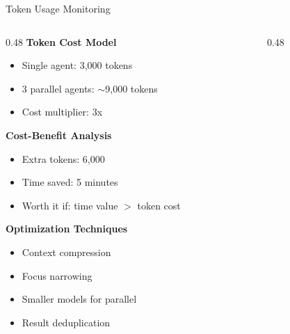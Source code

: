 \documentclass[aspectratio=169,11pt]{beamer}
\begin{document}
\begin{frame}{Token Usage Monitoring}
    \begin{columns}[T]
        \begin{column}{0.48\textwidth}
            \textbf{Token Cost Model}
            \begin{itemize}
                \item Single agent: 3,000 tokens
                \item 3 parallel agents: $\sim$9,000 tokens
                \item Cost multiplier: 3x
            \end{itemize}

            \vspace{0.2cm}
            \textbf{Cost-Benefit Analysis}
            \begin{itemize}
                \footnotesize
                \item Extra tokens: 6,000
                \item Time saved: 5 minutes
                \item Worth it if: time value $>$ token cost
            \end{itemize}

            \vspace{0.2cm}
            \textbf{Optimization Techniques}
            \begin{itemize}
                \footnotesize
                \item Context compression
                \item Focus narrowing
                \item Smaller models for parallel
                \item Result deduplication
            \end{itemize}
        \end{column}
        \begin{column}{0.48\textwidth}
\end{column}
\end{columns}
\end{frame}
\end{document}

